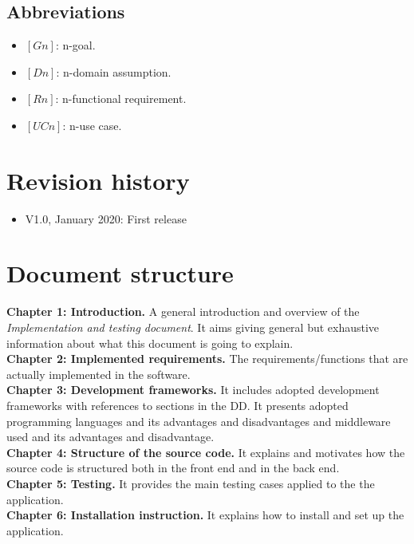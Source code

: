 \documentclass[../ITD.tex]{subfiles}
\begin{document}
    \subsection{Abbreviations}\label{subsec:abbreviations}
    \begin{itemize}
        \item $[Gn]$: n-goal.
        \item $[Dn]$: n-domain assumption.
        \item $[Rn]$: n-functional requirement.
        \item $[UCn]$: n-use case.
    \end{itemize}
    \newpage
    \section{Revision history}\label{sec:revision-history}
    \begin{itemize}
        \item V1.0, January  2020: First release
    \end{itemize}
    \section{Document structure}\label{sec:document-structure}
    \textbf{Chapter 1: Introduction.}
    A general introduction and overview of the \textit{Implementation and testing document}.
    It aims giving general but exhaustive information about what this document is going to explain.
    \\
    \textbf{Chapter 2: Implemented requirements.} The requirements/functions that are actually implemented in the software.
    \\
    \textbf{Chapter 3: Development frameworks.}  It includes adopted development frameworks with references to sections in the DD. It presents adopted programming languages and its advantages and disadvantages and middleware used and its advantages and disadvantage.
    \\
    \textbf{Chapter 4: Structure of the source code.} It explains and motivates how the source code is structured both in the front end and in the back end.
    \\
    \textbf{Chapter 5: Testing.} It provides the main testing cases applied to the the application.
    \\
    \textbf{Chapter 6: Installation instruction.} It explains how to install and set up the application.
\end{document}
